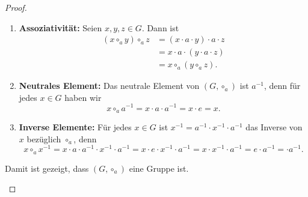 \documentclass{../problemset}
\begin{document}
\begin{problem}
\begin{proof}
\begin{enumerate}
\begin{enumerate}
			      \item \textbf{Assoziativität:} Seien $x, y, z \in G$. Dann ist
			            \begin{align*}
				            (x \circ_a y) \circ_a z & = (x \cdot a \cdot y) \cdot a \cdot z \\
				                                    & = x \cdot a \cdot (y \cdot a \cdot z) \\
				                                    & = x \circ_a (y \circ_a z).
			            \end{align*}

			      \item \textbf{Neutrales Element:} Das neutrale Element von $(G, \circ_a)$ ist $a^{-1}$, denn für jedes $x \in G$ haben wir
			            \[ x \circ_a a^{-1} = x \cdot a \cdot a^{-1} = x \cdot e = x. \]

			      \item \textbf{Inverse Elemente:} Für jedes $x \in G$ ist $x^{-1} = a^{-1} \cdot x^{-1} \cdot a^{-1}$ das Inverse von $x$ bezüglich $\circ_a$, denn
			            \[ x \circ_a x^{-1} = x \cdot a \cdot a^{-1} \cdot x^{-1} \cdot a^{-1} = x \cdot e \cdot x^{-1} \cdot a^{-1} =  x \cdot  x^{-1} \cdot a^{-1} = e \cdot a^{-1} = \cdot a^{-1}. \]

		      \end{enumerate}
		      Damit ist gezeigt, dass $(G, \circ_a)$ eine Gruppe ist. \checkmark
	\end{enumerate}
\end{proof}
\end{problem}
\end{document}

